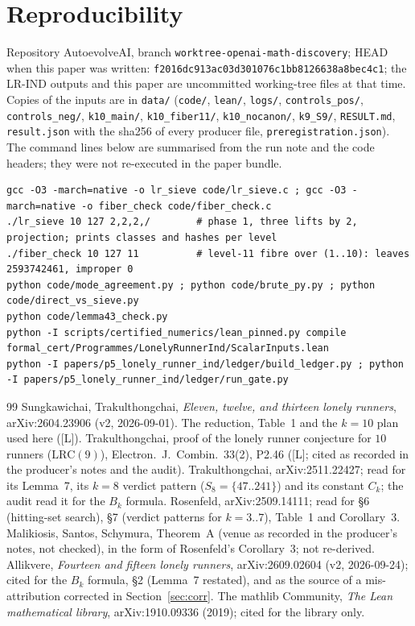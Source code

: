 \documentclass[10pt]{article}
\newcommand{\tier}[1]{\textsf{[#1]}}
\newcommand{\tL}{\tier{L}}
\newcommand{\LRC}[1]{\mathrm{LRC}(#1)}
\begin{document}
\section{Reproducibility}\label{sec:repro}
Repository AutoevolveAI, branch \texttt{worktree-openai-math-discovery}; HEAD when this paper was written: \texttt{f2016dc913ac03d301076c1bb8126638a8bec4c1}; the LR-IND outputs and this paper are uncommitted working-tree files at that time. Copies of the inputs are in \texttt{data/} (\texttt{code/}, \texttt{lean/}, \texttt{logs/}, \texttt{controls\_pos/}, \texttt{controls\_neg/}, \texttt{k10\_main/}, \texttt{k10\_fiber11/}, \texttt{k10\_nocanon/}, \texttt{k9\_S9/}, \texttt{RESULT.md}, \texttt{result.json} with the sha256 of every producer file, \texttt{preregistration.json}). The command lines below are summarised from the run note and the code headers; they were not re-executed in the paper bundle.
\begin{lstlisting}[basicstyle=\ttfamily\scriptsize]
gcc -O3 -march=native -o lr_sieve code/lr_sieve.c ; gcc -O3 -march=native -o fiber_check code/fiber_check.c
./lr_sieve 10 127 2,2,2,/        # phase 1, three lifts by 2, projection; prints classes and hashes per level
./fiber_check 10 127 11          # level-11 fibre over (1..10): leaves 2593742461, improper 0
python code/mode_agreement.py ; python code/brute_py.py ; python code/direct_vs_sieve.py
python code/lemma43_check.py
python -I scripts/certified_numerics/lean_pinned.py compile formal_cert/Programmes/LonelyRunnerInd/ScalarInputs.lean
python -I papers/p5_lonely_runner_ind/ledger/build_ledger.py ; python -I papers/p5_lonely_runner_ind/ledger/run_gate.py
\end{lstlisting}

\begin{thebibliography}{99}\small
{} Sungkawichai, Trakulthongchai, \emph{Eleven, twelve, and thirteen lonely runners}, arXiv:2604.23906 (v2, 2026-09-01). The reduction, Table~1 and the $k=10$ plan used here (\tL).
 Trakulthongchai, proof of the lonely runner conjecture for $10$ runners ($\LRC9$), Electron.\ J.\ Combin.\ 33(2), P2.46 (\tL; cited as recorded in the producer's notes and the audit).
 Trakulthongchai, arXiv:2511.22427; read for its Lemma~7, its $k=8$ verdict pattern ($S_8=\{47..241\}$) and its constant $C_k$; the audit read it for the $B_k$ formula.
 Rosenfeld, arXiv:2509.14111; read for \S6 (hitting-set search), \S7 (verdict patterns for $k=3..7$), Table~1 and Corollary~3.
 Malikiosis, Santos, Schymura, Theorem~A (venue as recorded in the producer's notes, not checked), in the form of Rosenfeld's Corollary~3; not re-derived.
 Allikvere, \emph{Fourteen and fifteen lonely runners}, arXiv:2609.02604 (v2, 2026-09-24); cited for the $B_k$ formula, \S2 (Lemma~7 restated), and as the source of a mis-attribution corrected in Section~\ref{sec:corr}.
 The mathlib Community, \emph{The Lean mathematical library}, arXiv:1910.09336 (2019); cited for the library only.
\end{thebibliography}
\end{document}
